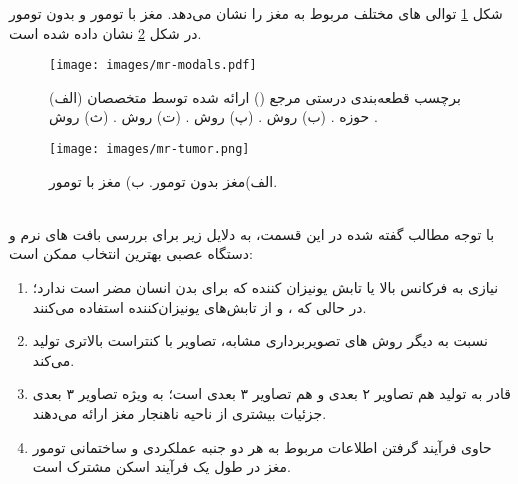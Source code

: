 شکل \ref{fig:mr-modals} توالی های مختلف مربوط به  مغز را نشان می‌دهد.
 مغز با تومور و بدون تومور در شکل \ref{fig:mr-tumor} نشان داده شده است.
\\
\begin{figure}[h]
\centerline{\texttt{[image: images/mr-modals.pdf]}}
\caption[نمونه ای از دنباله های مختلف  مغز]{    (الف) برچسب ‌قطعه‌بندی درستی مرجع () ارائه شده توسط متخصصان حوزه . (ب) روش . (پ) روش . (ت) روش . (ث) روش \cite{zhu2023brain}.
}
\label{fig:mr-modals}
\end{figure}
\begin{figure}
\centerline{\texttt{[image: images/mr-tumor.png]}}
\caption[مقایسه  مغز با تومور و بدون تومور]{الف)مغز بدون تومور. ب)  مغز با تومور\cite{soomro2022image}.}
\label{fig:mr-tumor}
\end{figure}
\\
با توجه مطالب گفته شده در این قسمت،  به دلایل زیر برای بررسی بافت های نرم و دستگاه عصبی بهترین انتخاب ممکن است:

\begin{enumerate}
    \item{} نیازی به فرکانس بالا یا تابش یونیزان کننده که برای بدن انسان مضر است ندارد؛ در حالی که ،  و  از تابش‌های یونیزان‌کننده استفاده می‌کنند.
    \item {} نسبت به دیگر روش های تصویربرداری مشابه، تصاویر با کنتراست بالاتری تولید می‌کند.
    \item {} قادر به تولید هم تصاویر ۲ بعدی و هم تصاویر ۳ بعدی است؛ به ویژه تصاویر ‌۳ بعدی جزئیات بیشتری از ناحیه ناهنجار مغز ارائه می‌دهند.
    \item {} حاوی فرآیند گرفتن اطلاعات مربوط به هر دو جنبه عملکردی و ساختمانی تومور مغز در طول یک فرآیند اسکن مشترک است.
\end{enumerate}

